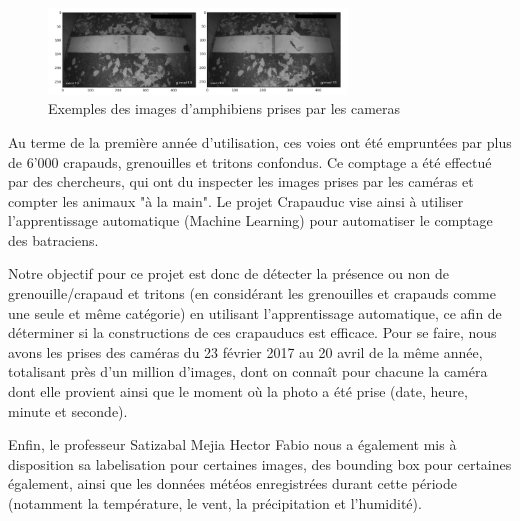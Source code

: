 \newpage

\begin{figure}[!htb]
    \centering
    \includegraphics[width=300px]{images/introduction_crapauduc_exemple_prise_camera.png}
    \caption{Exemples des images d'amphibiens prises par les cameras}
    \label{fig:Exemples des images d'amphibiens prises par les cameras}
\end{figure}

Au terme de la première année d'utilisation, ces voies ont été empruntées par plus de 6'000 crapauds, grenouilles et tritons confondus. Ce comptage a été effectué par des chercheurs, qui ont du inspecter les images prises par les caméras et compter les animaux "à la main". Le projet Crapauduc vise ainsi à utiliser l'apprentissage automatique (Machine Learning) pour automatiser le comptage des batraciens. \newline

Notre objectif pour ce projet est donc de détecter la présence ou non de grenouille/crapaud et tritons (en considérant les grenouilles et crapauds comme une seule et même catégorie) en utilisant l'apprentissage automatique, ce afin de déterminer si la constructions de ces crapauducs est efficace. Pour se faire, nous avons les prises des caméras du 23 février 2017 au 20 avril de la même année, totalisant près d'un million d'images, dont on connaît pour chacune la caméra dont elle provient ainsi que le moment où la photo a été prise (date, heure, minute et seconde).\newline

Enfin, le professeur Satizabal Mejia Hector Fabio nous a également mis à disposition sa labelisation pour certaines images, des bounding box pour certaines également, ainsi que les données météos enregistrées durant cette période (notamment la température, le vent, la précipitation et l'humidité).


